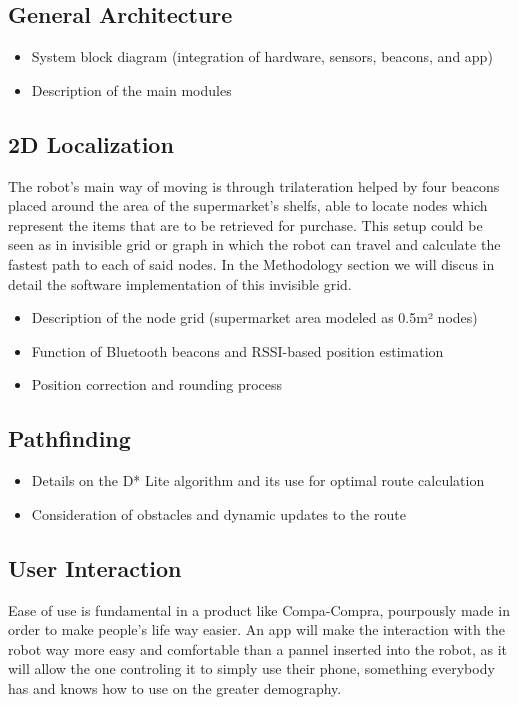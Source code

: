 \documentclass[a4paper,11pt]{article}
\begin{document}
\subsection{General Architecture}
\begin{itemize}
\item System block diagram (integration of hardware, sensors, beacons, and app)
\item Description of the main modules
\end{itemize}

\subsection{2D Localization}

The robot's main way of moving is through trilateration helped by four beacons placed
around the area of the supermarket's shelfs, able to locate nodes which represent the items
that are to be retrieved for purchase. This setup could be seen as in invisible grid or graph
in which the robot can travel and calculate the fastest path to each of said nodes. In the 
Methodology section we will discus in detail the software implementation of this 
invisible grid.

\begin{itemize}
\item Description of the node grid (supermarket area modeled as 0.5m² nodes)
\item Function of Bluetooth beacons and RSSI-based position estimation
\item Position correction and rounding process
\end{itemize}

\subsection{Pathfinding}
\begin{itemize}
\item Details on the D* Lite algorithm and its use for optimal route calculation
\item Consideration of obstacles and dynamic updates to the route
\end{itemize}

\subsection{User Interaction}
Ease of use is fundamental in a product like Compa-Compra, pourpously made in order
to make people's life way easier. An app will make the interaction with the robot
way more easy and comfortable than a pannel inserted into the robot, as it will allow
the one controling it to simply use their phone, something everybody has and knows how to use
on the greater demography.
\end{document}

